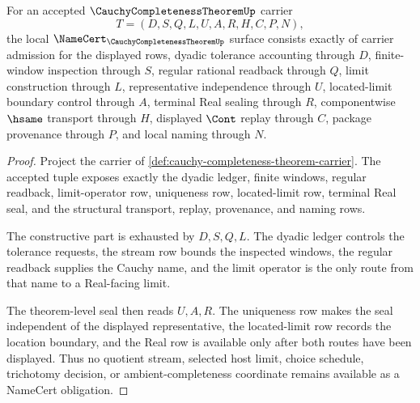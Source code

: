 \begin{theorem}
\label{thm:cauchy-completeness-theorem-namecert-obligations}
For an accepted $\CauchyCompletenessTheoremUp$ carrier
$$
T=(D,S,Q,L,U,A,R,H,C,P,N),
$$
the local $\NameCert_{\CauchyCompletenessTheoremUp}$ surface consists exactly of carrier admission for the displayed rows, dyadic tolerance accounting through $D$, finite-window inspection through $S$, regular rational readback through $Q$, limit construction through $L$, representative independence through $U$, located-limit boundary control through $A$, terminal Real sealing through $R$, componentwise $\hsame$ transport through $H$, displayed $\Cont$ replay through $C$, package provenance through $P$, and local naming through $N$.
\end{theorem}
\begin{proof}
Project the carrier of \autoref{def:cauchy-completeness-theorem-carrier}. The accepted tuple exposes exactly the dyadic ledger, finite windows, regular readback, limit-operator row, uniqueness row, located-limit row, terminal Real seal, and the structural transport, replay, provenance, and naming rows.

The constructive part is exhausted by $D,S,Q,L$. The dyadic ledger controls the tolerance requests, the stream row bounds the inspected windows, the regular readback supplies the Cauchy name, and the limit operator is the only route from that name to a Real-facing limit.

The theorem-level seal then reads $U,A,R$. The uniqueness row makes the seal independent of the displayed representative, the located-limit row records the location boundary, and the Real row is available only after both routes have been displayed. Thus no quotient stream, selected host limit, choice schedule, trichotomy decision, or ambient-completeness coordinate remains available as a NameCert obligation.
\end{proof}

